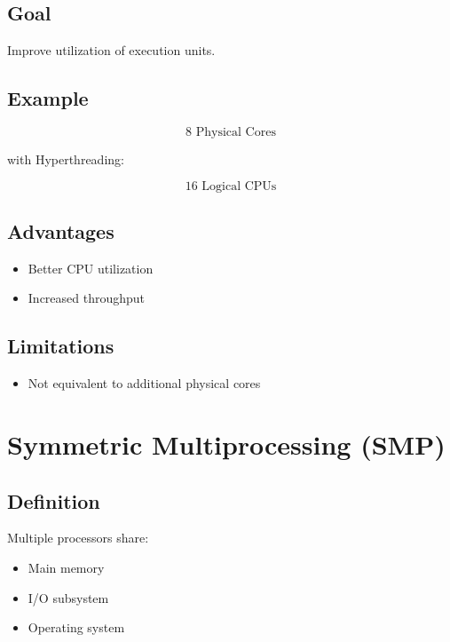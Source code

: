 \subsection{Goal}

Improve utilization of execution units.

\subsection{Example}

\[
8 \text{ Physical Cores}
\]

with Hyperthreading:

\[
16 \text{ Logical CPUs}
\]

\subsection{Advantages}

\begin{itemize}
\item Better CPU utilization
\item Increased throughput
\end{itemize}

\subsection{Limitations}

\begin{itemize}
\item Not equivalent to additional physical cores
\end{itemize}

\section{Symmetric Multiprocessing (SMP)}

\subsection{Definition}

Multiple processors share:

\begin{itemize}
\item Main memory
\item I/O subsystem
\item Operating system
\end{itemize}

